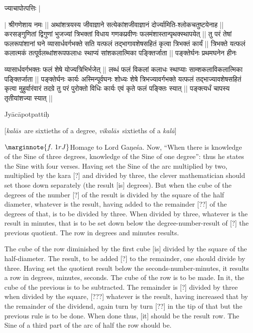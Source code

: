 \documentclass[12pt]{book}
\let\*=\d
\def\Ganesa{Ga\-\*ne\-\'sa}
\def\kala{\textit{ka\-l\=a}}
\def\kalas{\textit{ka\-l\=as}}
\def\vikalas{\textit{vi\-ka\-l\=as}}
\begin{document}
\begin{center}
{\s ज्याचापोत्पत्तिः |} \\
\end{center}
\bigskip

{\s $|$  श्रीगणेशाय नमः || 
अथांशत्रयस्य जीवाज्ञाने सत्येकांशजीवाज्ञानं
दोर्ज्यामिति-श्लोकचतुष्टयेनाह ||
करसङ्गुणितां द्विगुणां भुजज्यां
त्रिभक्तां विधाय
गणकप्रवीणः फलमंशास्तान्पृथक्स्थापयेत् ||
तु परं तेषां फलरूपांशानां घने व्यासार्धवर्गभक्ते सति
यत्फलं तद्भागावशेषसहितं कृत्वा त्रिभक्तं कार्यं ||
त्रिभक्ते यत्फलं कलात्मकं तत्पूर्वलब्धांशरूपफलाधः स्थाप्यं सांशकलात्मिका पङ्क्तिर्जाता ||
पङ्क्तेर्घनः प्रथमघनेन हीनः 

व्यासार्धवर्गभक्तः फलं शेषे योज्यत्रिभिर्भजेत् ||
लब्धं फलं विकलां कलाधः स्थाप्याः साम्शकलाविकलात्मिका
पङ्क्तिर्जाता ||
पङ्क्तेर्घनः कार्यः
अस्मिन्पूर्वघनः शोध्यः शेषे त्रिभज्यावर्गभक्ते यत्फलं तद्भाज्यावशेषसहितं
कृत्वा मुहुर्वारंवारं तदग्रे तु परं पुरोक्तो विधिः कार्यः एवं कृते फलं पङ्क्तिः स्यात् ||
पङ्क्त्यर्धं चापस्य तृतीयांशज्या स्यात् || }

\newpage


\begin{center}
{Jyācāpotpattiḥ}
\end{center}

[\kalas\ are sixtieths of a degree, \vikalas\ sixtieths of a \kala]
\medskip

$\marginnote{f.~1r J}$Homage to Lord \Ganesa. Now, ``When there is knowledge of the Sine of three degrees,
knowledge of the Sine of one degree'': thus he states the Sine with four verses.
Having set the Sine of the arc multiplied by two, multiplied by the kara [?] and divided by three, the 
clever mathematician should set those down separately (the result [is] degrees). 
But when the cube of the degrees of the number [?] of the result is divided
by the square of the half diameter, whatever is the result, having added to the 
remainder [??] of the degrees of that, is to be divided by three. When divided by
three, whatever is the result in minutes, that is to be set down below the degree-number-result
of [?] the previous quotient. The row in degrees and minutes results. 

The cube of the row diminished by the first cube [is] divided by the square of the 
half-diameter. The result, to be added [?] to the remainder, one should divide by three.
Having set the quotient  result below the seconds-number-minutes, it results a row 
in degrees, minutes, seconds.  The cube of the row is to be made. In it, the cube of
the previous is to be subtracted. The remainder is [?] divided by three when divided
by the square, [???] whatever is the result, having increased that by the remainder
of the dividend, again turn by turn [??] in the tip of that but the previous rule is to be 
done. When done thus, [it] should be the result row.  The Sine of a third part of the 
arc  of half the row should be.
\end{document}
